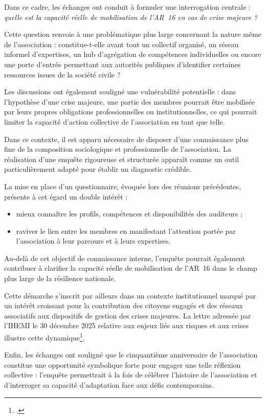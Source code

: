 \documentclass[12pt,a4paper]{article}
\begin{document}
Dans ce cadre, les échanges ont conduit à formuler une interrogation centrale :
\textit{quelle est la capacité réelle de mobilisation de l'AR~16 en cas de crise majeure ?}

Cette question renvoie à une problématique plus large concernant la nature
même de l'association : constitue-t-elle avant tout un collectif organisé,
un réseau informel d'expertises, un hub d'agrégation de compétences
individuelles ou encore une porte d'entrée permettant aux autorités
publiques d'identifier certaines ressources issues de la société civile ?

Les discussions ont également souligné une vulnérabilité potentielle :
dans l'hypothèse d'une crise majeure, une partie des membres pourrait être
mobilisée par leurs propres obligations professionnelles ou institutionnelles,
ce qui pourrait limiter la capacité d'action collective de l'association
en tant que telle.

Dans ce contexte, il est apparu nécessaire de disposer d'une connaissance
plus fine de la composition sociologique et professionnelle de l'association.
La réalisation d'une enquête rigoureuse et structurée apparaît comme un
outil particulièrement adapté pour établir un diagnostic crédible.

La mise en place d'un questionnaire, évoquée lors des réunions précédentes,
présente à cet égard un double intérêt :

\begin{itemize}
    \item mieux connaître les profils, compétences et disponibilités des auditeurs ;
    \item raviver le lien entre les membres en manifestant l'attention portée
    par l'association à leur parcours et à leurs expertises.
\end{itemize}

Au-delà de cet objectif de connaissance interne, l'enquête pourrait également
contribuer à clarifier la capacité réelle de mobilisation de l'AR~16 dans le
champ plus large de la résilience nationale.

Cette démarche s'inscrit par ailleurs dans un contexte institutionnel marqué
par un intérêt croissant pour la contribution des citoyens engagés et des
réseaux associatifs aux dispositifs de gestion des crises majeures. La lettre
adressée par l'IHEMI le 30 décembre 2025 relative aux enjeux liés aux risques
et aux crises illustre cette dynamique\footcite{IHEMI:2025:LIREC75}.

Enfin, les échanges ont souligné que le cinquantième anniversaire de
l'association constitue une opportunité symbolique forte pour engager une
telle réflexion collective : l'enquête permettrait à la fois de célébrer
l'histoire de l'association et d'interroger sa capacité d'adaptation face aux
défis contemporains.
\end{document}
